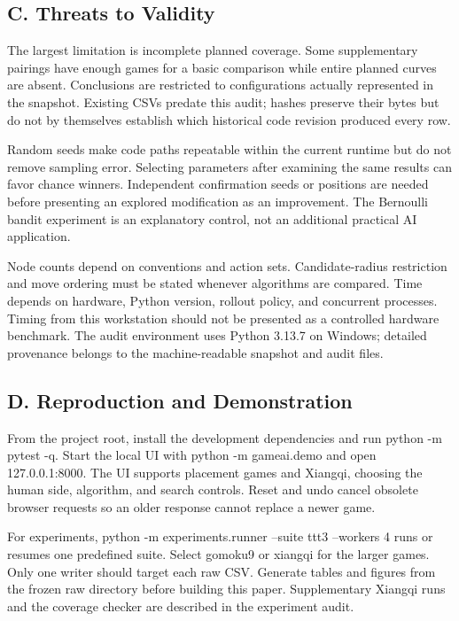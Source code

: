 \documentclass[conference]{IEEEtran}
\begin{document}
\subsection{C. Threats to Validity}

The largest limitation is incomplete planned coverage. Some supplementary pairings have enough games for a basic comparison while entire planned curves are absent. Conclusions are restricted to configurations actually represented in the snapshot. Existing CSVs predate this audit; hashes preserve their bytes but do not by themselves establish which historical code revision produced every row.


Random seeds make code paths repeatable within the current runtime but do not remove sampling error. Selecting parameters after examining the same results can favor chance winners. Independent confirmation seeds or positions are needed before presenting an explored modification as an improvement. The Bernoulli bandit experiment is an explanatory control, not an additional practical AI application.


Node counts depend on conventions and action sets. Candidate-radius restriction and move ordering must be stated whenever algorithms are compared. Time depends on hardware, Python version, rollout policy, and concurrent processes. Timing from this workstation should not be presented as a controlled hardware benchmark. The audit environment uses Python 3.13.7 on Windows; detailed provenance belongs to the machine-readable snapshot and audit files.


\subsection{D. Reproduction and Demonstration}

From the project root, install the development dependencies and run python -m pytest -q. Start the local UI with python -m gameai.demo and open 127.0.0.1:8000. The UI supports placement games and Xiangqi, choosing the human side, algorithm, and search controls. Reset and undo cancel obsolete browser requests so an older response cannot replace a newer game.


For experiments, python -m experiments.runner --suite ttt3 --workers 4 runs or resumes one predefined suite. Select gomoku9 or xiangqi for the larger games. Only one writer should target each raw CSV. Generate tables and figures from the frozen raw directory before building this paper. Supplementary Xiangqi runs and the coverage checker are described in the experiment audit.
\end{document}
